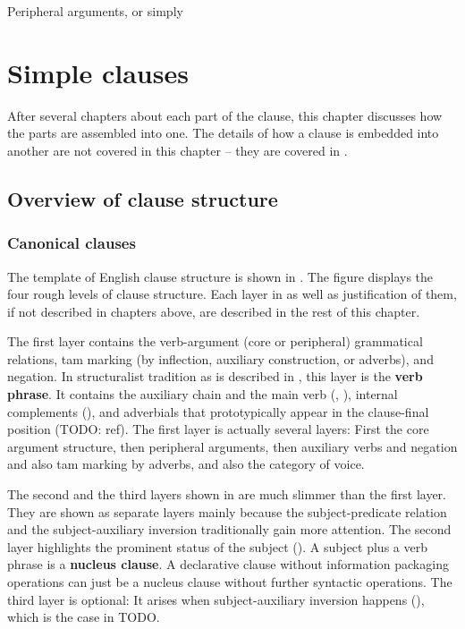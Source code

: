 \documentclass[UTF8, a4paper, oneside, scheme=plain]{ctexrep}
\newcommand*{\concept}[1]{\textbf{#1}}
\begin{document}
Peripheral arguments, or simply 

\chapter{Simple clauses}\label{chap:simple-clause}

After several chapters about each part of the clause,
this chapter discusses how the parts are assembled into one.
The details of how a clause is embedded into another are not covered in this chapter
-- they are covered in .

\section{Overview of clause structure}\label{sec:clause-template}

\subsection{Canonical clauses}

The template of English clause structure is shown in .
The figure displays the four rough levels of clause structure.
Each layer in  as well as justification of them,
if not described in chapters above, are described 
in the rest of this chapter.

The first layer contains the verb-argument (core or peripheral) grammatical relations,
\ac{tam} marking (by inflection, auxiliary construction, or adverbs), and negation.
In structuralist tradition as is described in \citet{cgel},
this layer is the \concept{verb phrase}.
It contains the auxiliary chain and the main verb 
(, ),
internal complements (),
and adverbials that prototypically appear in the clause-final position (TODO: ref).
The first layer is actually several layers:
First the core argument structure,
then peripheral arguments, 
then auxiliary verbs and negation and also \acs{tam} marking by adverbs,
and also the category of voice. 

The second and the third layers shown in 
are much slimmer than the first layer.
They are shown as separate layers mainly because 
the subject-predicate relation 
and the subject-auxiliary inversion 
traditionally gain more attention.
The second layer highlights the prominent status of the subject ().
A subject plus a verb phrase is a \concept{nucleus clause}.
A declarative clause without information packaging operations
can just be a nucleus clause without further syntactic operations.
The third layer is optional:
It arises when subject-auxiliary inversion happens (),
which is the case in TODO.
\end{document}
